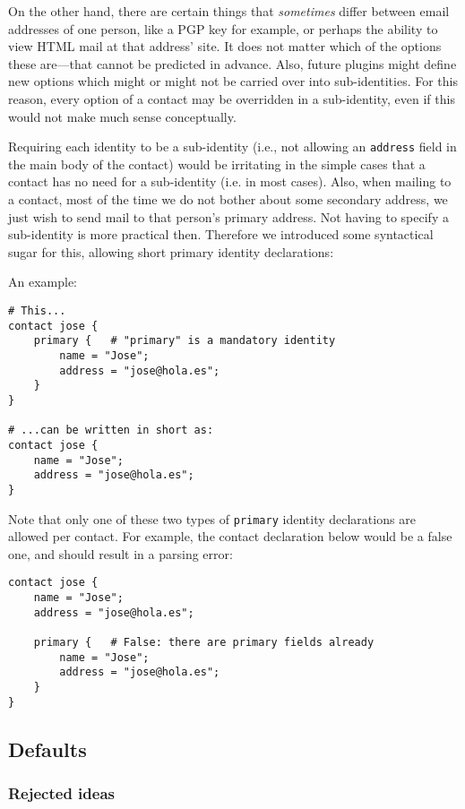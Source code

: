 \documentclass[a4paper]{article}
\begin{document}
On the other hand, there are certain things that \emph{sometimes} differ
between email addresses of one person, like a PGP key for example, or
perhaps the ability to view HTML mail at that address' site.  It does
not matter which of the options these are---that cannot be predicted in
advance.  Also, future plugins might define new options which might or
might not be carried over into sub-identities.  For this reason, every
option of a contact may be overridden in a sub-identity, even if this
would not make much sense conceptually.

Requiring each identity to be a sub-identity (i.e., not allowing an
\texttt{address} field in the main body of the contact) would be
irritating in the simple cases that a contact has no need for a
sub-identity (i.e. in most cases).  Also, when mailing to a contact,
most of the time we do not bother about some secondary address, we just
wish to send mail to that person's primary address.  Not having to
specify a sub-identity is more practical then.  Therefore we introduced
some syntactical sugar for this, allowing short primary identity
declarations:

An example:
\begin{verbatim}
# This...
contact jose {
    primary {	# "primary" is a mandatory identity
        name = "Jose";
        address = "jose@hola.es";
    }
}

# ...can be written in short as:
contact jose {
    name = "Jose";
    address = "jose@hola.es";
}
\end{verbatim}

Note that only one of these two types of \texttt{primary} identity
declarations are allowed per contact.  For example, the contact declaration
below would be a false one, and should result in a parsing error:

\begin{verbatim}
contact jose {
    name = "Jose";
    address = "jose@hola.es";

    primary {	# False: there are primary fields already
        name = "Jose";
        address = "jose@hola.es";
    }
}
\end{verbatim}


\subsection{Defaults}

\subsubsection{Rejected ideas}
\end{document}
